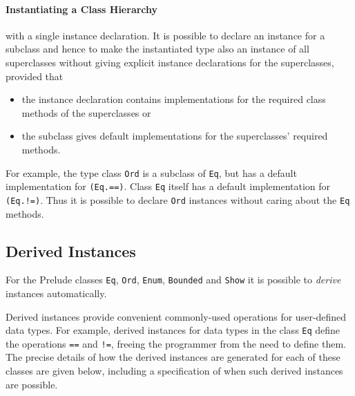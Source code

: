 \paragraph{Instantiating a Class Hierarchy} with a single instance declaration. It is possible to declare an instance for a subclass and hence to make the instantiated type also an instance of all superclasses without giving explicit instance declarations for the superclasses, provided that
\begin{itemize}
\item the instance declaration contains implementations for the required class methods of the superclasses or
\item the subclass gives default implementations for the superclasses' required methods.
\end{itemize}
For example, the type class \texttt{Ord} is a subclass of \texttt{Eq}, but has a default implementation for \texttt{(Eq.==)}.
Class \texttt{Eq} itself has a default implementation for \texttt{(Eq.!=)}.
Thus it is possible to declare  \texttt{Ord} instances without caring about the \texttt{Eq} methods.


\subsection{Derived Instances} \label{derivedcl}

For the Prelude classes \texttt{Eq}, \texttt{Ord}, \texttt{Enum}, \texttt{Bounded} and \texttt{Show} it is possible to \emph{derive} instances automatically.

\begin{flushleft}
       
\end{flushleft}

Derived instances provide convenient commonly-used operations for user-defined data types.
For example, derived instances for data types in the class \texttt{Eq} define the operations \texttt{==} and \texttt{!=}, freeing the programmer from the need to define them. The precise details of how
the derived instances are generated for each of these classes are given below,
including a specification of when such derived instances are possible.

